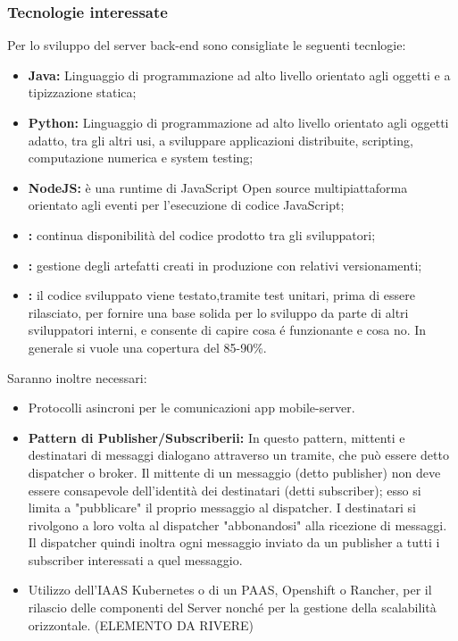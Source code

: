 	\subsubsection{Tecnologie interessate}
		Per lo sviluppo del server back-end sono consigliate le seguenti tecnlogie: 
		\begin{itemize}
			\item \textbf{Java:} Linguaggio di programmazione ad alto livello orientato agli oggetti e a tipizzazione statica;
			\item \textbf{Python:} Linguaggio di programmazione ad alto livello orientato agli oggetti adatto, tra gli altri usi, a sviluppare applicazioni distribuite, scripting, computazione numerica e system testing;
			\item \textbf{NodeJS:} è una runtime di JavaScript Open source multipiattaforma orientato agli eventi per l'esecuzione di codice JavaScript;
			\item \textbf{:} continua disponibilità del codice prodotto tra gli sviluppatori;
			\item \textbf{:} gestione degli artefatti creati in produzione con relativi versionamenti;
			\item \textbf{:} il codice sviluppato viene testato,tramite test unitari, prima di essere rilasciato, per fornire una base solida per lo sviluppo da parte di altri sviluppatori interni, e consente di capire cosa é funzionante e cosa no. In generale si vuole una copertura del 85-90\%.
		\end{itemize}
		Saranno inoltre necessari: 
		\begin{itemize}
			\item Protocolli asincroni per le comunicazioni app mobile-server.
			\item \textbf{Pattern di Publisher/Subscriberii:} In questo pattern, mittenti e destinatari di messaggi dialogano attraverso un tramite, che può essere detto dispatcher o broker. Il mittente di un messaggio (detto publisher) non deve essere consapevole dell'identità dei destinatari (detti subscriber); esso si limita a "pubblicare" il proprio messaggio al dispatcher. I destinatari si rivolgono a loro volta al dispatcher "abbonandosi" alla ricezione di messaggi. Il dispatcher quindi inoltra ogni messaggio inviato da un publisher a tutti i subscriber interessati a quel messaggio.
			\item Utilizzo dell’IAAS Kubernetes o di un PAAS, Openshift o Rancher, per il rilascio delle componenti del Server nonché per la gestione della scalabilità orizzontale. 
			(ELEMENTO DA RIVERE)
		\end{itemize}

